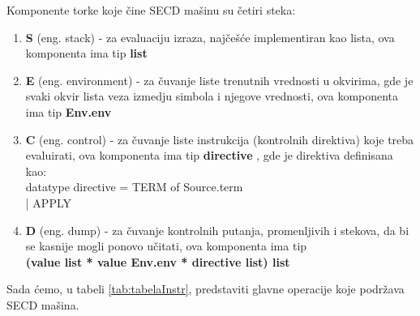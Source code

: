 Komponente torke koje čine SECD mašinu su četiri steka:
\begin{enumerate}
\item {\bf S} (eng. stack) - za evaluaciju izraza, najčešće implementiran kao lista, ova komponenta ima tip {\bf list}  
\item {\bf E} (eng. environment) - za čuvanje liste trenutnih vrednosti u okvirima, gde je svaki okvir lista veza izmedju simbola i njegove vrednosti, ova komponenta ima tip {\bf Env.env}  
\item {\bf C} (eng. control) - za čuvanje liste instrukcija (kontrolnih direktiva) koje treba evaluirati, ova komponenta ima tip {\bf directive} , gde je direktiva definisana kao:\\ datatype directive = TERM of Source.term\\
| APPLY
\item {\bf D} (eng. dump) - za čuvanje kontrolnih putanja, promenljivih i stekova, da bi se kasnije mogli ponovo učitati, ova komponenta ima tip\\ {\bf(value list * value Env.env * directive list) list}
\end{enumerate}

Sada ćemo, u tabeli \ref{tab:tabelaInstr}, predstaviti glavne operacije koje podržava SECD mašina. \\


